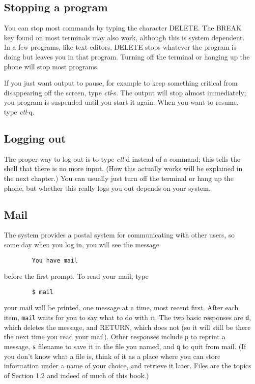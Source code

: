 \subsection{Stopping a program}
You can stop most commands by typing the character DELETE. The BREAK key found
on most terminals may also work, although this is system dependent. In a few
programs, like text editors, DELETE stops whatever the program is doing but
leaves you in that program. Turning off the terminal or hanging up the phone
will stop most programs.

If you just want output to pause, for example to keep something critical from
disappearing off the screen, type \textit{ctl}-s. The output will stop almost
immediately; you program is suspended until you start it again. When you want to
resume, type \textit{ctl}-q.


\subsection{Logging out}
The proper way to log out is to type \textit{ctl}-d instead of a command; this
tells the shell that there is no more input. (How this actually works will be
explained in the next chapter.) You can usually just turn off the terminal or
hang up the phone, but whether this really logs you out depends on your system.


\subsection{Mail}
The system provides a postal system for communicating with other users, so some
day when you log in, you will see the message
\begin{verbatim}
        You have mail
\end{verbatim}
before the first prompt. To read your mail, type
\begin{verbatim}
        $ mail
\end{verbatim}
your mail will be printed, one message at a time, most recent first. After each
item, \texttt{mail} waits for you to say what to do with it. The two basic
responses are \texttt{d}, which deletes the message, and RETURN, which does not
(so it will still be there the next time you read your mail). Other responses
include \texttt{p} to reprint a message, \texttt{s} filename to save it in the
file you named, and \texttt{q} to quit from mail. (If you don't know what a file
is, think of it as a place where you can store information under a name of your
choice, and retrieve it later. Files are the topics of Section 1.2 and indeed of
much of this book.)

